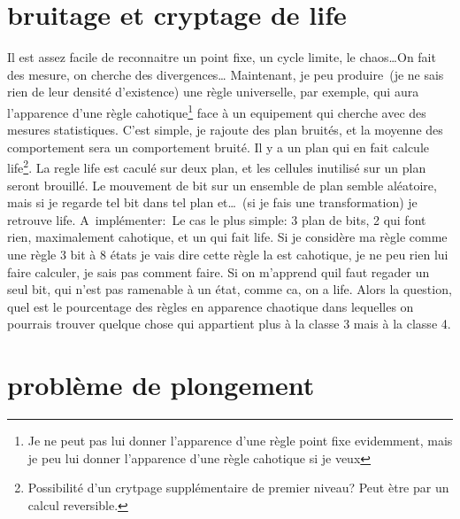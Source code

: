 \section{bruitage et cryptage de life}

Il est assez facile de reconnaitre un point fixe, un cycle limite, le
chaos\ldots On fait des mesure, on cherche des divergences\ldots
Maintenant, je peu produire~(je ne sais rien de leur densit\'e
d'existence) une r\`egle universelle,  par exemple, qui aura
l'apparence d'une r\`egle cahotique\footnote{%
  Je ne peut pas lui donner l'apparence d'une r\`egle point fixe
  evidemment, mais je peu lui donner l'apparence d'une r\`egle cahotique
  si je veux} %
face \`a un equipement qui cherche avec des mesures statistiques.
C'est simple, je rajoute des plan bruit\'es,
et la moyenne des comportement sera un comportement bruit\'e.
Il y a un plan qui en fait calcule life\footnote{%
  Possibilit\'e d'un crytpage suppl\'ementaire de premier niveau?
  Peut \`etre par un calcul reversible.}. %
La regle life est cacul\'e sur deux plan, et les cellules inutilis\'e sur
un plan seront brouill\'e. %
Le mouvement de bit sur un ensemble de plan semble al\'eatoire, mais si
je regarde tel bit dans tel plan et\ldots~(si je fais une
transformation) je retrouve life. %
A~impl\'ementer:~Le cas le plus simple: 3 plan de bits, 2 qui font
rien, maximalement cahotique, et un qui fait life. %
Si je consid\`ere ma r\`egle comme une r\`egle 3 bit \`a 8 \'etats je vais dire
cette r\`egle la est cahotique, je ne peu rien lui faire calculer, je
sais pas comment faire. %
Si on m'apprend quil faut regader un seul bit, qui n'est pas ramenable
\`a un \'etat, comme ca, on a life. %
Alors la question, quel est le pourcentage des r\`egles en apparence
chaotique dans lequelles on pourrais trouver quelque chose qui
appartient plus \`a la classe 3 mais \`a la classe 4.

\section{probl\`eme de plongement}

